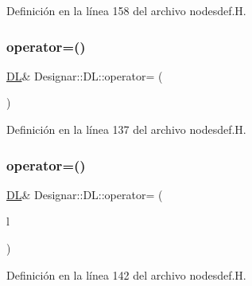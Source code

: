 Definición en la línea 158 del archivo nodesdef.\+H.

\mbox{\label{class_designar_1_1_d_l_a7eb7d13fee4174fa5f4166722316530d}} 
\subsubsection{\texorpdfstring{operator=()}{operator=()}\hspace{0.1cm}{\footnotesize\ttfamily [1/2]}}
{\footnotesize\ttfamily \hyperlink{class_designar_1_1_d_l}{DL}\& Designar\+::\+D\+L\+::operator= (\begin{DoxyParamCaption}\item[{const \hyperlink{class_designar_1_1_d_l}{DL} \&}]{ }\end{DoxyParamCaption})\hspace{0.3cm}{\ttfamily [inline]}}



Definición en la línea 137 del archivo nodesdef.\+H.

\mbox{\label{class_designar_1_1_d_l_adc892f364736bab874a6a739e88b5c60}} 
\subsubsection{\texorpdfstring{operator=()}{operator=()}\hspace{0.1cm}{\footnotesize\ttfamily [2/2]}}
{\footnotesize\ttfamily \hyperlink{class_designar_1_1_d_l}{DL}\& Designar\+::\+D\+L\+::operator= (\begin{DoxyParamCaption}\item[{\hyperlink{class_designar_1_1_d_l}{DL} \&\&}]{l }\end{DoxyParamCaption})\hspace{0.3cm}{\ttfamily [inline]}}



Definición en la línea 142 del archivo nodesdef.\+H.

\mbox{\label{class_designar_1_1_d_l_a005d23127d2743fec552cafce79095d4}} 
